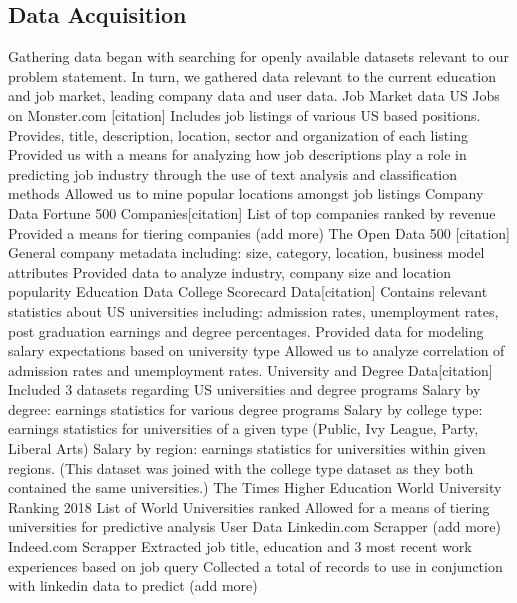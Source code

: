 \subsection{Data Acquisition}
Gathering data began with searching for openly available datasets relevant to our problem statement. In turn, we gathered data relevant to the current education and job market, leading company data and user data. 
Job Market data
US Jobs on Monster.com [citation]
Includes job listings of various US based positions. Provides, title, description, location, sector and organization of each listing 
Provided us with a means for analyzing how job descriptions play a role in predicting job industry through the use of text analysis and classification methods
Allowed us to mine popular locations amongst job listings 
Company Data
Fortune 500 Companies[citation]
List of top companies ranked by revenue
Provided a means for tiering companies 
(add more)
The Open Data 500 [citation]
General company metadata including: size, category, location, business model attributes 
Provided data to analyze industry, company size and location popularity
Education Data
College Scorecard Data[citation]
Contains relevant statistics about US universities including: admission rates, unemployment rates, post graduation earnings and degree percentages.
Provided data for modeling salary expectations based on university type
Allowed us to analyze correlation of admission rates and unemployment rates.
University and Degree Data[citation]
Included 3 datasets regarding US universities and degree programs
Salary by degree: earnings statistics for various degree programs 
Salary by college type: earnings statistics for universities of a given type (Public, Ivy League, Party, Liberal Arts)
Salary by region: earnings statistics for universities within given regions. (This dataset was joined with the college type dataset as they both contained the same universities.)
The Times Higher Education World University Ranking 2018
List of World Universities ranked
Allowed for a means of tiering universities for predictive analysis
User Data
Linkedin.com Scrapper
(add more)
Indeed.com Scrapper 
Extracted job title, education and 3 most recent work experiences based on job query 
Collected a total of records to use in conjunction with linkedin data to predict (add more)

